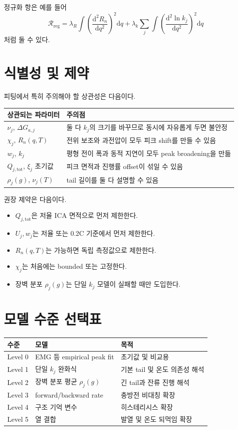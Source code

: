 \documentclass[11pt,a4paper]{article}
\newcommand{\dd}{\mathrm{d}}
\newcommand{\tot}{\mathrm{tot}}
\begin{document}
정규화 항은 예를 들어
\begin{equation}
\mathcal R_{\mathrm{reg}}=\lambda_R\int\left(\frac{\dd^2R_n}{\dd q^2}\right)^2\dd q+\lambda_k\sum_j\int\left(\frac{\dd^2\ln k_j}{\dd q^2}\right)^2\dd q
\end{equation}
처럼 둘 수 있다.

\section{식별성 및 제약}
피팅에서 특히 주의해야 할 상관성은 다음이다.

\begin{longtable}{p{}p{}}
\toprule
상관되는 파라미터 & 주의점 \\
\midrule
\endhead
\(\nu_j\), \(\Delta G_{a,j}\) & 둘 다 \(k_j\)의 크기를 바꾸므로 동시에 자유롭게 두면 불안정 \\
\(\chi_j\), \(R_n(q,T)\) & 전위 보조와 과전압이 모두 피크 shift를 만들 수 있음 \\
\(w_j\), \(k_j\) & 평형 전이 폭과 동적 지연이 모두 peak broadening을 만듦 \\
\(Q_{j,\tot}\), \(\xi_j\) 초기값 & 피크 면적과 진행률 offset이 섞일 수 있음 \\
\(\rho_j(g)\), \(\nu_j(T)\) & tail 길이를 둘 다 설명할 수 있음 \\
\bottomrule
\end{longtable}

권장 제약은 다음이다.
\begin{itemize}
\item \(Q_{j,\tot}\)은 저율 ICA 면적으로 먼저 제한한다.
\item \(U_j,w_j\)는 저율 또는 0.2C 기준에서 먼저 제한한다.
\item \(R_n(q,T)\)는 가능하면 독립 측정값으로 제한한다.
\item \(\chi_j\)는 처음에는 bounded 또는 고정한다.
\item 장벽 분포 \(\rho_j(g)\)는 단일 \(k_j\) 모델이 실패할 때만 도입한다.
\end{itemize}

\section{모델 수준 선택표}
\begin{longtable}{p{}p{}p{}}
\toprule
수준 & 모델 & 목적 \\
\midrule
\endhead
Level 0 & EMG 등 empirical peak fit & 초기값 및 비교용 \\
Level 1 & 단일 \(k_j\) 완화식 & 기본 tail 및 온도 의존성 해석 \\
Level 2 & 장벽 분포 평균 \(\rho_j(g)\) & 긴 tail과 잔류 진행 해석 \\
Level 3 & forward/backward rate & 충방전 비대칭 확장 \\
Level 4 & 구조 기억 변수 & 히스테리시스 확장 \\
Level 5 & 열 결합 & 발열 및 온도 되먹임 확장 \\
\bottomrule
\end{longtable}
\end{document}
